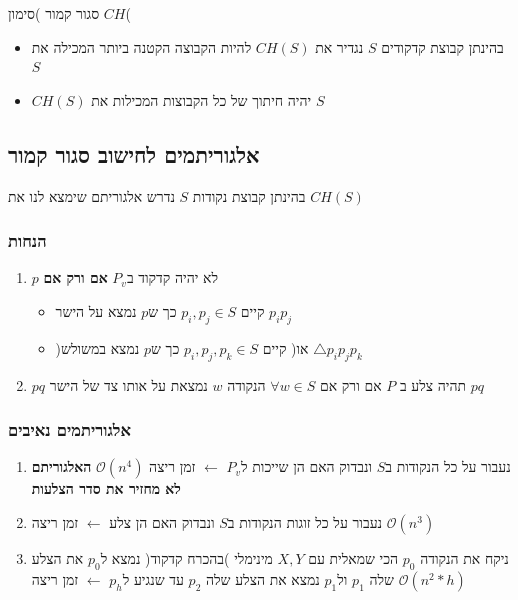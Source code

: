 \documentclass{article}
\makeatletter
\newcommand*{\saved@uline}{}
\let\saved@uline\uline
\newcommand*{\mathuline}{%
  \mathpalette{\math@uline\saved@uline}%
}
\newcommand*{\math@uline}[3]{%
  \mbox{#1{$#2#3\m@th$}}%
}
\renewcommand*{\uline}{%
  \relax  
  \ifmmode
    \expandafter\mathuline
  \else
    \expandafter\saved@uline
  \fi
}
\makeatother
\begin{document}
\uline{ סגור קמור )סימון $CH$(}
\begin{itemize}
\item בהינתן קבוצת קדקודים $S$ נגדיר את $CH(S)$ להיות הקבוצה הקטנה ביותר המכילה את $S$
\item $CH(S)$ יהיה חיתוך של כל הקבוצות המכילות את $S$
\end{itemize}


\subsection{אלגוריתמים לחישוב סגור קמור}
בהינתן קבוצת נקודות $S$ נדרש אלגוריתם שימצא לנו את $CH(S)$
\subsubsection{הנחות}
\begin{enumerate}
\item $p$ לא יהיה קדקוד ב$P_v$ \textbf{אם ורק אם}
\begin{itemize}
\item קיים $p_i,p_j \in S$ כך ש$p$ נמצא על הישר $p_ip_j$
\item )או( קיים $p_i,p_j,p_k \in S$ כך ש$p$ נמצא במשולש $\triangle p_ip_jp_k$
\end{itemize}
\item $pq$ תהיה צלע ב $P$ אם ורק אם  $\forall w \in S$ הנקודה $w$ נמצאת על אותו צד של הישר $pq$ 
\end{enumerate}

\subsubsection{אלגוריתמים נאיבים}
\begin{enumerate}
\item נעבור על כל הנקודות ב$S$ ונבדוק האם הן שייכות ל$P_v$ $\leftarrow$ זמן ריצה $\mathcal{O}(n^4)$ \textbf{האלגוריתם לא מחזיר את סדר הצלעות}
\item נעבור על כל זוגות הנקודות ב$S$ ונבדוק האם הן צלע $\leftarrow$ זמן ריצה $\mathcal{O}(n^3)$
\item ניקח את הנקודה $p_0$ הכי שמאלית עם $X,Y$ מינימלי )בהכרח קדקוד( נמצא ל$p_0$ את הצלע שלה $p_1$ ול$p_1$ נמצא את הצלע שלה $p_2$ עד שנגיע ל$p_h$ $\leftarrow$ זמן ריצה $\mathcal{O}(n^2*h)$ 
\end{enumerate}
\end{document}
